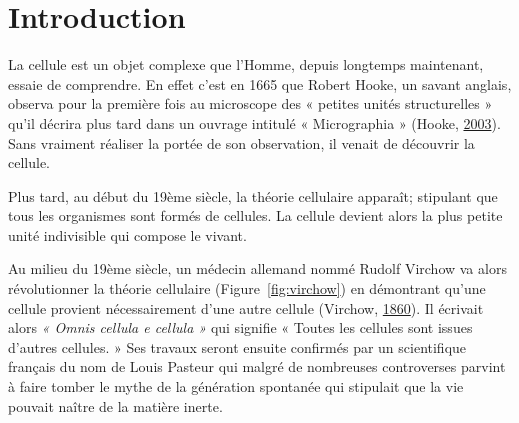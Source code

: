 \documentclass[12pt,a4paper,twoside,openright]{book}
\begin{document}
\mainmatter

\newpage

\cleardoublepage

\chapter{Introduction}\label{introduction}

La cellule est un objet complexe que l'Homme, depuis longtemps
maintenant, essaie de comprendre. En effet c'est en 1665 que Robert
Hooke, un savant anglais, observa pour la première fois au microscope
des « petites unités structurelles » qu'il décrira plus tard dans un
ouvrage intitulé « Micrographia » (Hooke,
\hyperref[ref-hooke2003micrographia]{2003}). Sans vraiment réaliser la
portée de son observation, il venait de découvrir la cellule.

Plus tard, au début du 19ème siècle, la théorie cellulaire apparaît;
stipulant que tous les organismes sont formés de cellules. La cellule
devient alors la plus petite unité indivisible qui compose le vivant.

Au milieu du 19ème siècle, un médecin allemand nommé Rudolf Virchow va
alors révolutionner la théorie cellulaire (Figure~\ref{fig:virchow}) en
démontrant qu'une cellule provient nécessairement d'une autre cellule
(Virchow, \hyperref[ref-virchow1860cellular]{1860}). Il écrivait alors
\emph{« Omnis cellula e cellula »} qui signifie « Toutes les cellules
sont issues d'autres cellules. » Ses travaux seront ensuite confirmés
par un scientifique français du nom de Louis Pasteur qui malgré de
nombreuses controverses parvint à faire tomber le mythe de la génération
spontanée qui stipulait que la vie pouvait naître de la matière inerte.
\end{document}
